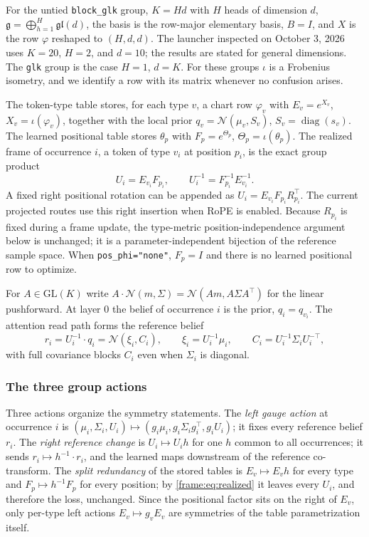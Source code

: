 \documentclass[11pt]{article}
\theoremstyle{definition}
\theoremstyle{remark}
\providecommand{\GL}{\mathrm{GL}}
\providecommand{\gl}{\mathfrak{gl}}
\providecommand{\g}{\mathfrak{g}}
\providecommand{\Normal}{\mathcal{N}}
\begin{document}
For the untied \texttt{block\_glk} group, $K=Hd$ with $H$ heads of dimension $d$, $\g=\bigoplus_{h=1}^{H}\gl(d)$, the basis is the row-major elementary basis, $B=I$, and $X$ is the row $\varphi$ reshaped to $(H,d,d)$. The launcher inspected on October 3, 2026 uses $K=20$, $H=2$, and $d=10$; the results are stated for general dimensions. The \texttt{glk} group is the case $H=1$, $d=K$. For these groups $\iota$ is a Frobenius isometry, and we identify a row with its matrix whenever no confusion arises.

The token-type table stores, for each type $v$, a chart row $\varphi_v$ with $E_v=e^{X_v}$, $X_v=\iota(\varphi_v)$, together with the local prior $q_v=\Normal(\mu_v,S_v)$, $S_v=\operatorname{diag}(s_v)$. The learned positional table stores $\theta_p$ with $F_p=e^{\Theta_p}$, $\Theta_p=\iota(\theta_p)$. The realized frame of occurrence $i$, a token of type $v_i$ at position $p_i$, is the exact group product
\begin{equation}\label{frame:eq:realized}
U_i=E_{v_i}F_{p_i},\qquad U_i^{-1}=F_{p_i}^{-1}E_{v_i}^{-1}.
\end{equation}
A fixed right positional rotation can be appended as \(U_i=E_{v_i}F_{p_i}R_{p_i}^{\top}\). The current projected routes use this right insertion when RoPE is enabled. Because \(R_{p_i}\) is fixed during a frame update, the type-metric position-independence argument below is unchanged; it is a parameter-independent bijection of the reference sample space. When \texttt{pos\_phi="none"}, \(F_p=I\) and there is no learned positional row to optimize.

For $A\in\GL(K)$ write $A\cdot\Normal(m,\Sigma)=\Normal(Am,A\Sigma A^\top)$ for the linear pushforward. At layer $0$ the belief of occurrence $i$ is the prior, $q_i=q_{v_i}$. The attention read path forms the reference belief
\begin{equation}\label{frame:eq:reference}
r_i=U_i^{-1}\cdot q_i=\Normal(\xi_i,C_i),\qquad \xi_i=U_i^{-1}\mu_i,\qquad C_i=U_i^{-1}\Sigma_iU_i^{-\top},
\end{equation}
with full covariance blocks $C_i$ even when $\Sigma_i$ is diagonal.

\subsubsection{The three group actions}

Three actions organize the symmetry statements. The \emph{left gauge action} at occurrence $i$ is $(\mu_i,\Sigma_i,U_i)\mapsto(g_i\mu_i,g_i\Sigma_ig_i^\top,g_iU_i)$; it fixes every reference belief $r_i$. The \emph{right reference change} is $U_i\mapsto U_ih$ for one $h$ common to all occurrences; it sends $r_i\mapsto h^{-1}\cdot r_i$, and the learned maps downstream of the reference co-transform. The \emph{split redundancy} of the stored tables is $E_v\mapsto E_vh$ for every type and $F_p\mapsto h^{-1}F_p$ for every position; by \eqref{frame:eq:realized} it leaves every $U_i$, and therefore the loss, unchanged. Since the positional factor sits on the right of $E_v$, only per-type left actions $E_v\mapsto g_vE_v$ are symmetries of the table parametrization itself.
\end{document}
